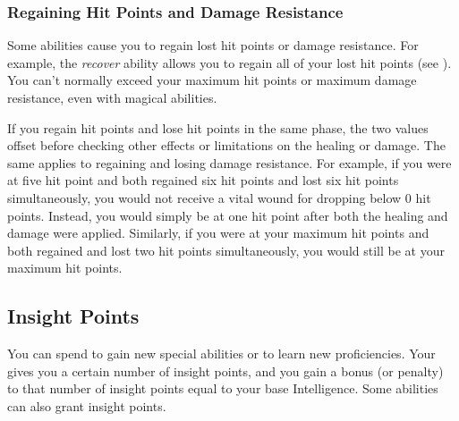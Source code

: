         \subsubsection{Regaining Hit Points and Damage Resistance}\label{Regaining Hit Points and Damage Resistance}
            Some abilities cause you to regain lost hit points or damage resistance.
            For example, the \textit{recover} ability allows you to regain all of your lost hit points (see ).
            You can't normally exceed your maximum hit points or maximum damage resistance, even with magical abilities.

             If you regain hit points and lose hit points in the same phase, the two values offset before checking other effects or limitations on the healing or damage.
            The same applies to regaining and losing damage resistance.
            For example, if you were at five hit point and both regained six hit points and lost six hit points simultaneously, you would not receive a vital wound for dropping below 0 hit points.
            Instead, you would simply be at one hit point after both the healing and damage were applied.
            Similarly, if you were at your maximum hit points and both regained and lost two hit points simultaneously, you would still be at your maximum hit points.

    \subsection{Insight Points}\label{Insight Points}
        You can spend  to gain new special abilities or to learn new proficiencies.
        Your  gives you a certain number of insight points, and you gain a bonus (or penalty) to that number of insight points equal to your base Intelligence.
        Some abilities can also grant insight points.

